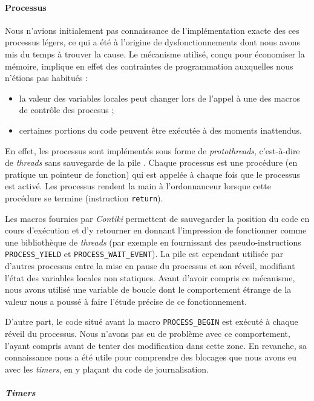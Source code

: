 \paragraph{Processus}

Nous n’avions initialement pas connaissance de l’implémentation exacte des ces processus légers, ce qui a été à l’origine de dysfonctionnements dont nous avons mis du temps à trouver la cause.
Le mécanisme utilisé, conçu pour économiser la mémoire, implique en effet des contraintes de programmation auxquelles nous n’étions pas habitués :
\begin{itemize}
	\item la valeur des variables locales peut changer lors de l’appel à une des macros de contrôle des procesus ;
	\item certaines portions du code peuvent être exécutée à des moments inattendus.
\end{itemize}

En effet, les processus sont implémentés sous forme de \emph{protothreads}, c’est-à-dire de \emph{threads} sans sauvegarde de la pile .
Chaque processus est une procédure (en pratique un pointeur de fonction) qui est appelée à chaque fois que le processus est activé.
Les processus rendent la main à l’ordonnanceur lorsque cette procédure se termine (instruction \texttt{return}).

Les macros fournies par \emph{Contiki} permettent de sauvegarder la position du code en cours d’exécution et d’y retourner en donnant l’impression de fonctionner comme une bibliothèque de \emph{threads} (par exemple en fournissant des pseudo-instructions \texttt{PROCESS\_YIELD} et \texttt{PROCESS\_WAIT\_EVENT}).
La pile est cependant utilisée par d’autres processus entre la mise en pause du processus et son réveil, modifiant l’état des variables locales non statiques.
Avant d’avoir compris ce mécanisme, nous avons utilisé une variable de boucle dont le comportement étrange de la valeur nous a poussé à faire l’étude précise de ce fonctionnement.
\label{variables-locales}

D’autre part, le code situé avant la macro \texttt{PROCESS\_BEGIN} est exécuté à chaque réveil du processus.
Nous n’avons pas eu de problème avec ce comportement, l’ayant compris avant de tenter des modification dans cette zone.
En revanche, sa connaissance nous a été utile pour comprendre des blocages que nous avons eu avec les \emph{timers}, en y plaçant du code de journalisation.

\paragraph{\emph{Timers}}

